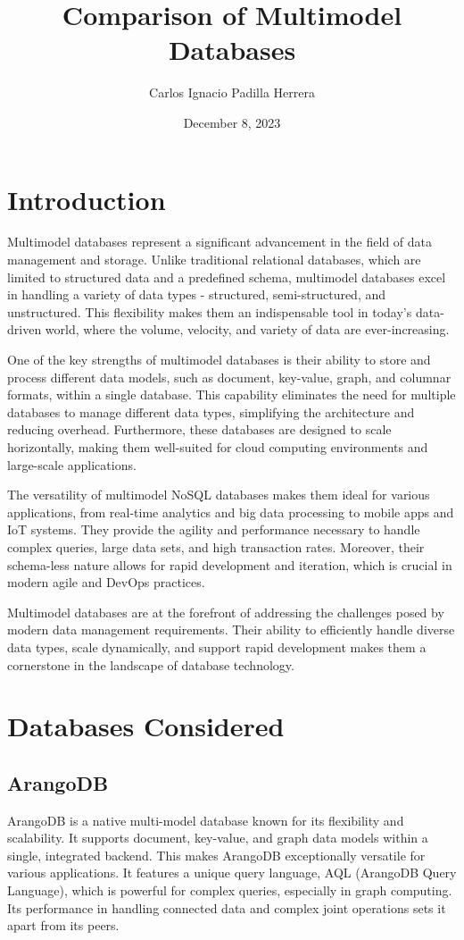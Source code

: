 \documentclass[a3paper,11pt]{extarticle}
\title{Comparison of Multimodel Databases}
\author{Carlos Ignacio Padilla Herrera}
\date{December 8, 2023}
\begin{document}
\maketitle
\newpage

\section*{Introduction}

Multimodel  databases represent a significant advancement in the field of data management and storage. Unlike traditional relational databases, which are limited to structured data and a predefined schema, multimodel databases excel in handling a variety of data types - structured, semi-structured, and unstructured. This flexibility makes them an indispensable tool in today's data-driven world, where the volume, velocity, and variety of data are ever-increasing.

One of the key strengths of multimodel databases is their ability to store and process different data models, such as document, key-value, graph, and columnar formats, within a single database. This capability eliminates the need for multiple databases to manage different data types, simplifying the architecture and reducing overhead. Furthermore, these databases are designed to scale horizontally, making them well-suited for cloud computing environments and large-scale applications.

The versatility of multimodel NoSQL databases makes them ideal for various applications, from real-time analytics and big data processing to mobile apps and IoT systems. They provide the agility and performance necessary to handle complex queries, large data sets, and high transaction rates. Moreover, their schema-less nature allows for rapid development and iteration, which is crucial in modern agile and DevOps practices.

Multimodel databases are at the forefront of addressing the challenges posed by modern data management requirements. Their ability to efficiently handle diverse data types, scale dynamically, and support rapid development makes them a cornerstone in the landscape of database technology.

\newpage

\section*{Databases Considered}

\subsection*{ArangoDB}
ArangoDB is a native multi-model database known for its flexibility and scalability. It supports document, key-value, and graph data models within a single, integrated backend. This makes ArangoDB exceptionally versatile for various applications. It features a unique query language, AQL (ArangoDB Query Language), which is powerful for complex queries, especially in graph computing. Its performance in handling connected data and complex joint operations sets it apart from its peers.
\end{document}
